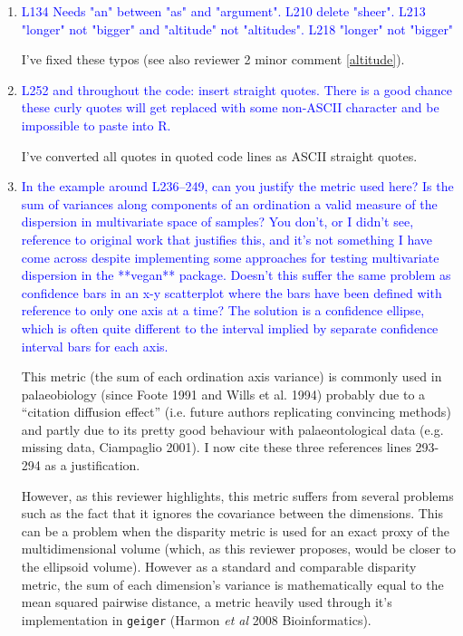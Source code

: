 \documentclass[12pt,letterpaper]{article}
\begin{document}
\begin{enumerate}
\item{\textcolor{blue}{L134 Needs "an" between "as" and "argument". L210 delete "sheer". L213 "longer" not "bigger" and "altitude" not "altitudes". L218 "longer" not "bigger"}}

I've fixed these typos (see also reviewer 2 minor comment \ref{altitude}).

\item{\textcolor{blue}{L252 and throughout the code: insert straight quotes. There is a good chance these curly quotes will get replaced with some non-ASCII character and be impossible to paste into R.}}

I've converted all quotes in quoted code lines as ASCII straight quotes.

\item{\textcolor{blue}{In the example around L236--249, can you justify the metric used here? Is the sum of variances along components of an ordination a valid measure of the dispersion in multivariate space of samples? You don't, or I didn't see, reference to original work that justifies this, and it's not something I have come across despite implementing some approaches for testing multivariate dispersion in the **vegan** package. Doesn't this suffer the same problem as confidence bars in an x-y scatterplot where the bars have been defined with reference to only one axis at a time? The solution is a confidence ellipse, which is often quite different to the interval implied by separate confidence interval bars for each axis.}}

This metric (the sum of each ordination axis variance) is commonly used in palaeobiology (since Foote 1991 and Wills et al. 1994) probably due to a ``citation diffusion effect'' (i.e. future authors replicating convincing methods) and partly due to its pretty good behaviour with palaeontological data (e.g. missing data, Ciampaglio 2001).
I now cite these three references lines 293-294 as a justification.

However, as this reviewer highlights, this metric suffers from several problems such as the fact that it ignores the covariance between the dimensions.
This can be a problem when the disparity metric is used for an exact proxy of the multidimensional volume (which, as this reviewer proposes, would be closer to the ellipsoid volume).
However as a standard and comparable disparity metric, the sum of each dimension's variance is mathematically equal to the mean squared pairwise distance, a metric heavily used through it's implementation in \texttt{geiger} (Harmon \textit{et al} 2008 Bioinformatics).


\end{enumerate}
\end{document}
